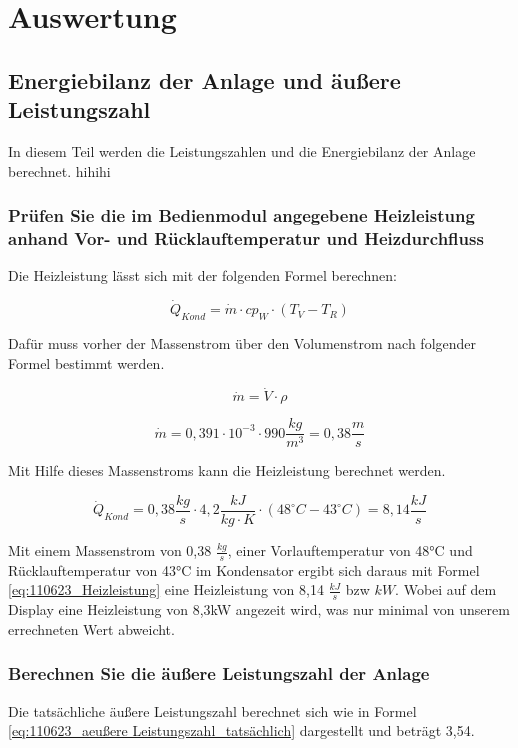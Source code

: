 \section{Auswertung}
\label{sec:Auswertung}
\subsection{Energiebilanz der Anlage und äußere Leistungszahl}
In diesem Teil werden die Leistungszahlen und die Energiebilanz der Anlage berechnet.
hihihi
\subsubsection{Prüfen Sie die im Bedienmodul angegebene Heizleistung anhand Vor- und Rücklauftemperatur und Heizdurchfluss}
\label{subsubsec:Heizleistung}

Die Heizleistung lässt sich mit der folgenden Formel berechnen:

\begin{equation}
\dot Q_{Kond}= \dot m \cdot cp_{W} \cdot (T_{V} - T_{R})
\label{eq:110623_Heizleistung}
\end{equation}

Dafür muss vorher der Massenstrom über den Volumenstrom nach folgender Formel bestimmt werden.

\begin{equation}
    \dot{m}= \dot{V}\cdot \rho
\end{equation}

$$\dot{m}= 0,391 \cdot 10^{-3} \cdot 990 \frac{kg}{m^3}=0,38 \frac{m}{s}$$

Mit Hilfe dieses Massenstroms kann die Heizleistung berechnet werden.

$$\dot Q_{Kond}= 0,38 \frac{kg}{s} \cdot 4,2 \frac{kJ}{kg \cdot K} \cdot (48 ^{\circ}C - 43 ^{\circ}C) = 8,14 \frac{kJ}{s}$$

Mit einem Massenstrom von 0,38 $\frac{kg}{s}$, einer Vorlauftemperatur von 48°C und Rücklauftemperatur von 43°C im Kondensator ergibt sich daraus mit Formel \ref{eq:110623_Heizleistung} eine Heizleistung von 8,14 $\frac{kJ}{s}$ bzw $kW$. Wobei auf dem Display eine Heizleistung von 8,3kW angezeit wird, was nur minimal von unserem errechneten Wert abweicht.
\subsubsection{Berechnen Sie die äußere Leistungszahl der Anlage}
Die tatsächliche äußere Leistungszahl berechnet sich wie in Formel \ref{eq:110623_aeußere Leistungszahl_tatsächlich} dargestellt und beträgt 3,54.


